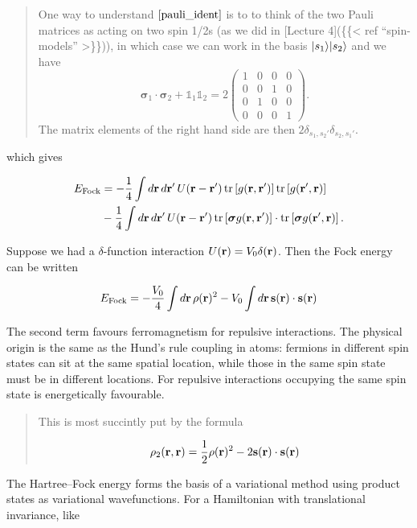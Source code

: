 \begin{quote}
One way to understand \(\eqref{pauli_ident}\) is to to think of the two
Pauli matrices as acting on two spin 1/2s (as we did in {[}Lecture
4{]}(\{\{\textless{} ref ``spin-models'' \textgreater\}\})), in which
case we can work in the basis \(\lvert{s_1}\rangle\lvert{s_2}\rangle\) and we have \[
\boldsymbol{\sigma}_1\cdot \boldsymbol{\sigma}_2+ \mathbb{1}_1\mathbb{1}_2 = 2\begin{pmatrix}
1 & 0 & 0 & 0 \\
0 & 0 & 1 & 0 \\
0 & 1 & 0 & 0 \\
0 & 0 & 0 & 1 
\end{pmatrix}.
\] The matrix elements of the right hand side are then
\(2\delta_{s_1,s_2'}\delta_{s_2,s_1'}\).
\end{quote}

which gives

\[
\begin{align}
E_{\text{Fock}} &=-\frac{1}{4} \int d\mathbf{r}\, d\mathbf{r}'\,  U(\mathbf{r}-\mathbf{r}')\operatorname{tr}\left[g(\mathbf{r},\mathbf{r}')\right]\operatorname{tr}\left[g(\mathbf{r}',\mathbf{r})\right]\nonumber\\&-\frac{1}{4}\int d\mathbf{r}\, d\mathbf{r}'\,  U(\mathbf{r}-\mathbf{r}')\operatorname{tr}\left[\boldsymbol{\sigma}g(\mathbf{r},\mathbf{r}')\right]\cdot\operatorname{tr}\left[\boldsymbol{\sigma}g(\mathbf{r}',\mathbf{r})\right].
\end{align}
\]

Suppose we had a \(\delta\)-function interaction
\(U(\mathbf{r})=V_0 \delta(\mathbf{r})\). Then the Fock energy can be written

\[
\begin{align}
E_{\text{Fock}} =-\frac{V_0}{4} \int d\mathbf{r}\, \rho(\mathbf{r})^2-V_0\int d\mathbf{r}\, \mathbf{s}(\mathbf{r})\cdot\mathbf{s}(\mathbf{r})
\end{align}
\]

The second term favours ferromagnetism for repulsive interactions. The
physical origin is the same as the Hund's rule coupling in atoms:
fermions in different spin states can sit at the same spatial location,
while those in the same spin state must be in different locations. For
repulsive interactions occupying the same spin state is energetically
favourable.

\begin{quote}
This is most succintly put by the formula

\[
\rho_2(\mathbf{r},\mathbf{r}) = \frac{1}{2}\rho(\mathbf{r})^2 - 2\mathbf{s}(\mathbf{r})\cdot\mathbf{s}(\mathbf{r})
\]
\end{quote}

The Hartree--Fock energy forms the basis of a variational method using
product states as variational wavefunctions. For a Hamiltonian with
translational invariance, like

